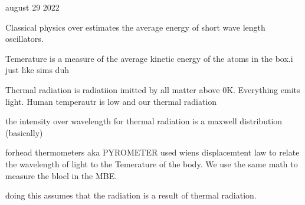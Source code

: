 august 29 2022

Classical physics over estimates the average energy of short wave length oscillators. 

Temerature is a measure of the average kinetic energy of the atoms in the box.i just like sims duh

Thermal radiation is radiatiion imitted by all matter above 0K. Everything emits light. Human temperautr is low and our thermal radiation

the intensity over wavelength for thermal radiation is a maxwell distribution (basically)

forhead thermometers aka PYROMETER used wiens displacemtent law to relate the wavelength of light to the Temerature of the body. We use the same math to measure the blocl in the MBE. 

doing this assumes that the radiation is a result of thermal radiation.
